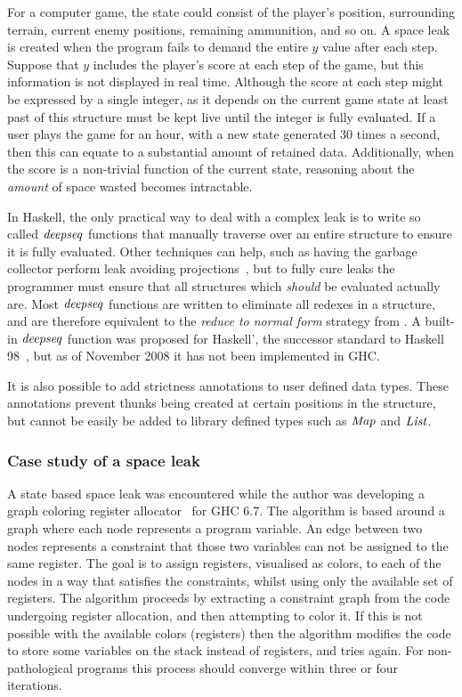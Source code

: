 For a computer game, the state could consist of the player's position, surrounding terrain, current enemy positions, remaining ammunition, and so on. A space leak is created when the program fails to demand the entire $y$ value after each step. Suppose that $y$ includes the player's score at each step of the game, but this information is not displayed in real time. Although the score at each step might be expressed by a single integer, as it depends on the current game state at least past of this structure must be kept live until the integer is fully evaluated. If a user plays the game for an hour, with a new state generated 30 times a second, then this can equate to a substantial amount of retained data. Additionally, when the score is a non-trivial function of the current state, reasoning about the \emph{amount} of space wasted becomes intractable.

In Haskell, the only practical way to deal with a complex leak is to write so called $\operatorname{\mathit{deepseq}}$ functions that manually traverse over an entire structure to ensure it is fully evaluated. Other techniques can help, such as having the garbage collector perform leak avoiding projections~\cite{wadler:fixing-space-leaks}, but to fully cure leaks the programmer must ensure that all structures which \emph{should} be evaluated actually are. Most $\operatorname{\mathit{deepseq}}$ functions are written to eliminate all redexes in a structure, and are therefore equivalent to the \emph{reduce to normal form} strategy from \cite{trinder:algorithm}. A built-in $\operatorname{\mathit{deepseq}}$ function was proposed for Haskell', the successor standard to Haskell 98~\cite{haskell-prime:deepseq}, but as of November 2008 it has not been implemented in GHC. 

It is also possible to add strictness annotations to user defined data types. These annotations prevent thunks being created at certain positions in the structure, but cannot be easily be added to library defined types such as $\operatorname{\mathit{Map}}$ and $\operatorname{\mathit{List}}$.


\subsubsection{Case study of a space leak}

A state based space leak was encountered while the author was developing a graph coloring register allocator~\cite{chaitin:graph-coloring, smith:graph-coloring} for GHC 6.7. The algorithm is based around a graph where each node represents a program variable. An edge between two nodes represents a constraint that those two variables can not be assigned to the same register. The goal is to assign registers, visualised as colors, to each of the nodes in a way that satisfies the constraints, whilst using only the available set of registers. The algorithm proceeds by extracting a constraint graph from the code undergoing register allocation, and then attempting to color it. If this is not possible with the available colors (registers) then the algorithm modifies the code to store some variables on the stack instead of registers, and tries again. For non-pathological programs this process should converge within three or four iterations.

